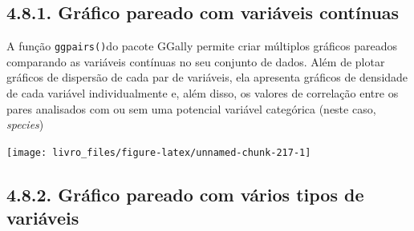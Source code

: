 \documentclass[
]{book}
\newenvironment{Shaded}{\begin{snugshade}}{\end{snugshade}}
\newcommand{\AttributeTok}[1]{\textcolor[rgb]{0.61,0.61,0.61}{#1}}
\newcommand{\FunctionTok}[1]{\textcolor[rgb]{0,0,0}{#1}}
\newcommand{\NormalTok}[1]{#1}
\newcommand{\SpecialCharTok}[1]{\textcolor[rgb]{0,0,0}{#1}}
\newcommand{\StringTok}[1]{\textcolor[rgb]{0.5,0.5,0.5}{#1}}
\begin{document}
\hypertarget{gruxe1fico-pareado-com-variuxe1veis-contuxednuas}{%
\subsection{4.8.1. Gráfico pareado com variáveis contínuas}\label{gruxe1fico-pareado-com-variuxe1veis-contuxednuas}}

A função \texttt{ggpairs()}do pacote GGally permite criar múltiplos gráficos pareados comparando as variáveis contínuas no seu conjunto de dados. Além de plotar gráficos de dispersão de cada par de variáveis, ela apresenta gráficos de densidade de cada variável individualmente e, além disso, os valores de correlação entre os pares analisados com ou sem uma potencial variável categórica (neste caso, \emph{species})

\begin{Shaded}
\end{Shaded}

\begin{center}\texttt{[image: livro\_files/figure-latex/unnamed-chunk-217-1]} \end{center}

\hypertarget{gruxe1fico-pareado-com-vuxe1rios-tipos-de-variuxe1veis}{%
\subsection{4.8.2. Gráfico pareado com vários tipos de variáveis}\label{gruxe1fico-pareado-com-vuxe1rios-tipos-de-variuxe1veis}}
\end{document}
